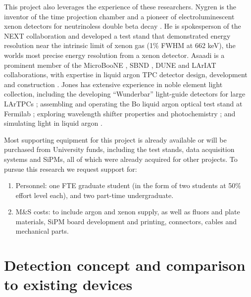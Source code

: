 This project also leverages the experience of these researchers.  Nygren is the inventor of the time projection chamber \cite{Nygren:1976fe} and a pioneer of electroluminescent xenon detectors for neutrinoless double beta decay \cite{Gonzalez-Diaz:2015oba,Mart,Nygren:2009zz,Goldschmidt:2011ria,Nygren:2007zzc,Sinclair:2011zz}.  He is spokesperson of the NEXT collaboration and developed a test stand that demonstrated energy resolution near the intrinsic limit of xenon gas \cite{Alvarez:2012yxw} (1\% FWHM at 662 keV), the worlds most precise energy resolution from a xenon detector. Asaadi is a prominent member of the MicroBooNE \cite{Chen:2007ae}, SBND \cite{Antonello:2015lea}, DUNE \cite{Acciarri:2015uup} and LArIAT \cite{Cavanna:2014iqa} collaborations, with expertise in liquid argon TPC detector design, development and construction \cite{Asaadi:2014iva}.  Jones has extensive experience in noble element light collection,  including the developing ``Wunderbar'' light-guide detectors for large LArTPCs \cite{Jones:2013sfa,Baptista:2012bf,Moss:2014ota}; assembling and operating the Bo liquid argon optical test stand at Fermilab \cite{Jones:2013bca,Jones:2013mfa,Jones:2013nea}; exploring wavelength shifter properties and photochemistry \cite{Jones:2012hm}; and simulating light in liquid argon \cite{uBOpticalSim,Jones:2013sfa}.

Most supporting equipment for this project is already available or will be purchased from University funds, including the test stands, data acquisition systems and SiPMs, all of which were already acquired for other projects.  To pursue this research we request support for: 

\begin{enumerate}
\item  Personnel: one FTE graduate student (in the form of two students at 50\% effort level each), and two part-time undergraduate.
\item  M\&S costs: to include argon and xenon supply, as well as fluors and plate materials, SiPM board development and printing, connectors, cables and mechanical parts.
\end{enumerate}



\section{Detection concept and comparison to existing devices \label{sec:concept}}

